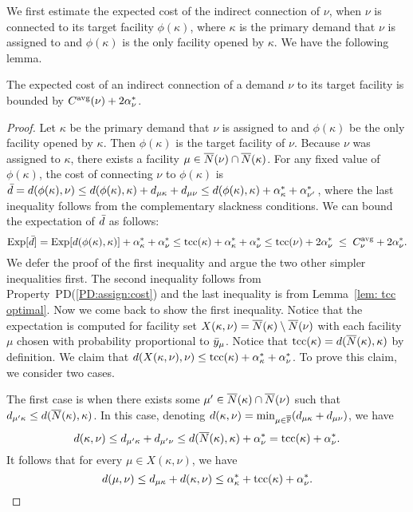 \documentclass[11pt]{article}
\begin{document}
We first estimate the expected cost of the indirect
connection of $\nu$, when $\nu$ is connected to its target
facility $\phi(\kappa)$, where $\kappa$ is the primary
demand that $\nu$ is assigned to and $\phi(\kappa)$ is the
only facility opened by $\kappa$. We have the following
lemma.
\begin{lemma}
  \label{lem:echu indirect}
  The expected cost of an indirect connection of a demand
  $\nu$ to its target facility is bounded by
  $C^{{\mbox{\scriptsize\rm avg}}}(\nu)+2\alpha_{\nu}^\ast$.
\end{lemma}
\begin{proof}
  Let $\kappa$ be the primary demand that $\nu$ is assigned
  to and $\phi(\kappa)$ be the only facility opened by
  $\kappa$. Then $\phi(\kappa)$ is the target facility of
  $\nu$. Because $\nu$ was assigned to $\kappa$, there
  exists a facility $\mu\in {\overline{N}}(\nu)\cap {\overline{N}}(\kappa)$.
  For any fixed value of $\phi(\kappa)$, the cost of
  connecting $\nu$ to $\phi(\kappa)$ is ${\bar d} =
  d(\phi(\kappa),\nu) \le d(\phi(\kappa),\kappa)+
  d_{\mu\kappa}+d_{\mu\nu} \le
  d(\phi(\kappa),\kappa)+\alpha_{\kappa}^\ast +
  \alpha_{\nu'}^\ast$, where the last inequality follows
  from the complementary slackness conditions. We can bound
  the expectation of ${\bar d}$ as follows:
%
\begin{equation}
	\label{eqn: 1.76 connection cost}
  \mbox{\rm Exp}[{\bar d}] = \mbox{\rm Exp}[d(\phi(\kappa), \kappa)]  + \alpha_{\kappa}^\ast + \alpha_{\nu}^\ast
  \leq \textrm{tcc}(\kappa) + \alpha_{\kappa}^\ast + \alpha_{\nu}^\ast
  \leq \textrm{tcc}(\nu) + 2\alpha_{\nu}^\ast\;\leq\; C^{{\mbox{\scriptsize\rm avg}}}_{\nu} + 2\alpha_{\nu}^\ast.
\end{equation}
%
We defer the proof of the first inequality and argue the two
other simpler inequalities first. The second inequality
follows from Property~PD(\ref{PD:assign:cost}) and the last
inequality is from Lemma~\ref{lem: tcc optimal}. Now we come
back to show the first inequality. Notice that the
expectation is computed for facility set
$X(\kappa,\nu)={\overline{N}}(\kappa) \setminus {\overline{N}}(\nu)$ with
each facility $\mu$ chosen with probability proportional to
${\bar y}_{\mu}$. Notice that
$\textrm{tcc}(\kappa)=d({\overline{N}}(\kappa),\kappa)$ by definition. We
claim that $d(X(\kappa,\nu),\nu) \leq \textrm{tcc}(\kappa) +
\alpha_{\kappa}^\ast + \alpha_{\nu}^\ast$. To prove this
claim, we consider two cases.

 The first case is when there exists some $\mu'\in
{\overline{N}}(\kappa) \cap {\overline{N}}(\nu)$ such that $d_{\mu' \kappa}
\leq d({\overline{N}}(\kappa), \kappa)$. In this case, denoting
$d(\kappa, \nu)=\min_{\mu\in\overline{\mathbb{F}}} (d_{\mu\kappa} +
d_{\mu\nu})$, we have
\begin{equation*}
  d(\kappa,\nu)\leq
  d_{\mu'\kappa} + d_{\mu'\nu} \leq d({\overline{N}}(\kappa),\kappa) +
  \alpha_{\nu}^\ast=\textrm{tcc}(\kappa)+\alpha_{\nu}^\ast. 
\end{equation*}
It follows that for every $\mu\in X(\kappa,\nu)$, we have
\begin{equation*}
  d(\mu,\nu) \leq d_{\mu\kappa} + d(\kappa,\nu) \leq
  \alpha_{\kappa}^\ast + \textrm{tcc}(\kappa) + \alpha_{\nu}^\ast.
\end{equation*}


\end{proof}
\end{document}
